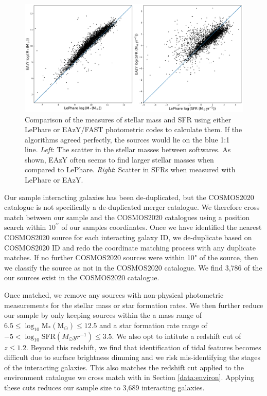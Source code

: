 \begin{figure}
    \centering
    \includegraphics[width=\textwidth]{Chapter3/figures/mass-sfr-scatter.pdf}
    \caption[Comparison of the measures of stellar mass and SFR using either LePhare or EAzY/FAST photometric codes to calculate them.]{Comparison of the measures of stellar mass and SFR using either LePhare or EAzY/FAST photometric codes to calculate them. If the algorithms agreed perfectly, the sources would lie on the blue 1:1 line. \textit{Left}: The scatter in the stellar masses between softwares. As shown, EAzY often seems to find larger stellar masses when compared to LePhare. \textit{Right}: Scatter in SFRs when measured with LePhare or EAzY.}
    \label{fig:difference-measures}
\end{figure}

Our sample interacting galaxies has been de-duplicated, but the COSMOS2020 catalogue is not specifically a de-duplicated merger catalogue. We therefore cross match between our sample and the COSMOS2020 catalogues using a position search within $10^{\prime\prime}$ of our samples coordinates. Once we have identified the nearest COSMOS2020 source for each interacting galaxy ID, we de-duplicate based on COSMOS2020 ID and redo the coordinate matching process with any duplicate matches. If no further COSMOS2020 sources were within 10" of the source, then we classify the source as not in the COSMOS2020 catalogue. We find 3,786 of the our sources exist in the COSMOS2020 catalogue.

Once matched, we remove any sources with non-physical photometric measurements for the stellar mass or star formation rates. We then further reduce our sample by only keeping sources within the a mass range of $6.5 \leq \log_{10} \text{M}_{*}(\text{M}_{\odot}) \leq 12.5$ and a star formation rate range of $-5 < \log_{10} \text{SFR} (M_{\odot}yr^{-1}) \leq 3.5$. We also opt to intitute a redshift cut of $z \leq 1.2$. Beyond this redshift, we find that identification of tidal features becomes difficult due to surface brightness dimming and we risk mis-identifying the stages of the interacting galaxies. This also matches the redshift cut applied to the environment catalogue we cross match with in Section \ref{data:environ}. Applying these cuts reduces our sample size to 3,689 interacting galaxies.

